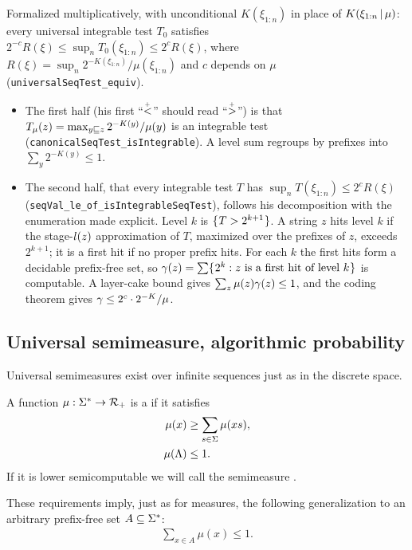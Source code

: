 \begin{formalization}
Formalized multiplicatively, with unconditional \( K(\xi_{1:n}) \) in place of
\( K(\xi_{1:n} \,\vert\, \mu) \): every universal integrable test \( T_{0} \) satisfies
\( 2^{-c} R(\xi) \le \sup_{n} T_{0}(\xi_{1:n}) \le 2^{c} R(\xi) \), where
\( R(\xi) = \sup_{n} 2^{-K(\xi_{1:n})}/\mu(\xi_{1:n}) \) and \( c \) depends on \( \mu \)
(\texttt{universalSeqTest\_equiv}).
\begin{itemize}
\item The first half (his first ``\( \stackrel{{}_+}{<} \)'' should read ``\( \stackrel{{}_+}{>} \)'') is that
  \( T_{\mu}(z) = \max_{y \sqsubseteq z} 2^{-K(y)}/\mu(y) \) is an integrable test
  (\texttt{canonicalSeqTest\_isIntegrable}). A level sum regroups by prefixes into
  \( \sum_{y} 2^{-K(y)} \le 1 \).
\item The second half, that every integrable test \( T \) has
  \( \sup_{n} T(\xi_{1:n}) \le 2^{c} R(\xi) \)
  (\texttt{seqVal\_le\_of\_isIntegrableSeqTest}), follows his decomposition with the
  enumeration made explicit. Level \( k \) is \( \mathopen\{\mskip 1mu T > 2^{k+1}\mskip 1mu\mathclose\} \). A string \( z \)
  hits level \( k \) if the stage-\( l(z) \) approximation of \( T \), maximized over the
  prefixes of \( z \), exceeds \( 2^{k+1} \); it is a first hit if no proper prefix hits. For
  each \( k \) the first hits form a decidable prefix-free set, so
  \( \gamma(z) = \sum\mathopen\{\mskip 1mu2^{k} : z \text{ is a first hit of level } k\mskip 1mu\mathclose\} \) is computable. A
  layer-cake bound gives \( \sum_{z} \mu(z) \gamma(z) \le 1 \), and the coding theorem gives
  \( \gamma \le 2^{c} \cdot 2^{-K}/\mu \).
\end{itemize}
\end{formalization}

\subsection{Universal semimeasure, algorithmic probability}

Universal semimeasures exist over infinite sequences just as in the discrete
space.

\begin{definition}
  \label{def:g2.3.31}
  \leanok
  A function \( \mu:\Sigma^{*}\to\mathcal{R}_{+} \) is a  if it satisfies
 \begin{align*}
     \mu(x)      &\ge\sum_{s\in\Sigma}\mu(xs),
\\ \mu(\Lambda) &\le 1.
 \end{align*}
If it is lower semicomputable we will call the semimeasure .
\end{definition}
These requirements imply, just as for measures,
the following generalization to an arbitrary prefix-free
set \( A\subseteq \Sigma^{*} \):
 \begin{align*}
   \sum_{x\in A}\mu(x)\le 1.
 \end{align*}

